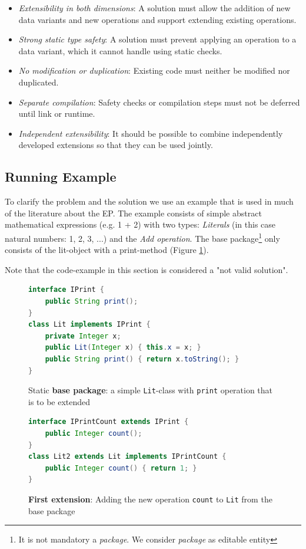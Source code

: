 \documentclass{report}
\begin{document}
\begin{itemize}
  \item \emph{Extensibility in both dimensions}: A solution must allow the addition of new data variants and new operations and support extending existing operations.
  \item \emph{Strong static type safety}: A solution must prevent applying an operation to a data variant, which it cannot handle using static checks.
  \item \emph{No modification or duplication}: Existing code must neither be modified nor duplicated.
  \item \emph{Separate compilation}: Safety checks or compilation steps must not be deferred until link or runtime.
  \item \emph{Independent extensibility}: It should be possible to combine independently developed extensions so that they can be used jointly.
\end{itemize}


\subsection{Running Example}
\label{example}

To clarify the problem and the solution we use an example that is used in much of the literature about the EP. The example consists of simple abstract mathematical expressions (e.g. 1 + 2) with two types: \emph{Literals} (in this case natural numbers: 1, 2, 3, ...) and the \emph{Add operation}. The base package\footnote{It is not mandatory a \emph{package}. We consider \emph{package} as editable entity} only consists of the lit-object with a print-method (Figure \ref{exampleLitBaseClass}).

Note that the code-example in this section is considered a "not valid solution".


\begin{figure}[H]
\begin{lstlisting}[language=java]
interface IPrint {
    public String print();
}
class Lit implements IPrint {
    private Integer x;
    public Lit(Integer x) { this.x = x; }
    public String print() { return x.toString(); }
}
\end{lstlisting}
\caption{Static \textbf{base package}: a simple \lstinline{Lit}-class with \lstinline{print} operation that is to be extended}
\label{exampleLitBaseClass}
\end{figure}
\begin{figure}[H]
\begin{lstlisting}[language=java]
interface IPrintCount extends IPrint {
    public Integer count();
}
class Lit2 extends Lit implements IPrintCount {
    public Integer count() { return 1; }
}
\end{lstlisting}
\caption{\textbf{First extension}: Adding the new operation \lstinline{count} to \lstinline{Lit} from the base package}
\label{exampleFirstExtension}
\end{figure}
\end{document}
